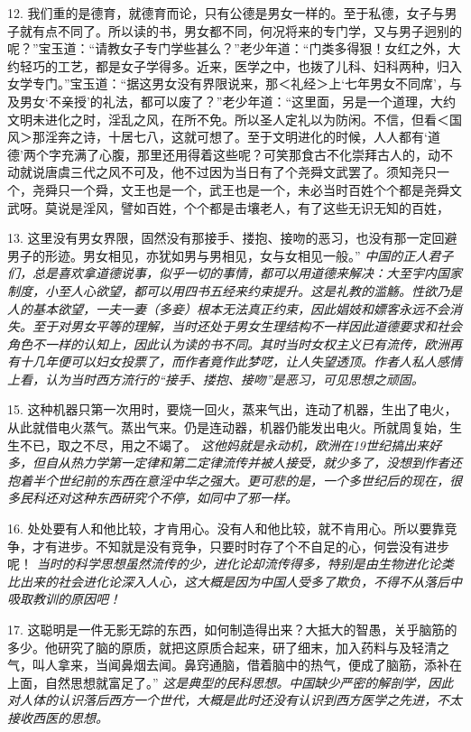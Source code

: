 12. 我们重的是德育，就德育而论，只有公德是男女一样的。至于私德，女子与男子就有点不同了。所以读的书，男女都不同，何况将来的专门学，又与男子迥别的呢？”宝玉道：“请教女子专门学些甚么？”老少年道：“门类多得狠！女红之外，大约轻巧的工艺，都是女子学得多。近来，医学之中，也拨了儿科、妇科两种，归入女学专门。”宝玉道：“据这男女没有界限说来，那＜礼经＞上‘七年男女不同席’，与及男女‘不亲授’的礼法，都可以废了？”老少年道：“这里面，另是一个道理，大约文明未进化之时，淫乱之风，在所不免。所以圣人定礼以为防闲。不信，但看＜国风＞那淫奔之诗，十居七八，这就可想了。至于文明进化的时候，人人都有‘道德’两个字充满了心腹，那里还用得着这些呢？可笑那食古不化崇拜古人的，动不动就说唐虞三代之风不可及，他不过因为当日有了个尧舜文武罢了。须知尧只一个，尧舜只一个舜，文王也是一个，武王也是一个，未必当时百姓个个都是尧舜文武呀。莫说是淫风，譬如百姓，个个都是击壤老人，有了这些无识无知的百姓，

13. 这里没有男女界限，固然没有那接手、搂抱、接吻的恶习，也没有那一定回避男子的形迹。男女相见，亦犹如男与男相见，女与女相见一般。”
\emph{中国的正人君子们，总是喜欢拿道德说事，似乎一切的事情，都可以用道德来解决：大至宇内国家制度，小至人心欲望，都可以用四书五经来约束提升。这是礼教的滥觞。性欲乃是人的基本欲望，一夫一妻（多妾）根本无法真正约束，因此娼妓和嫖客永远不会消失。至于对男女平等的理解，当时还处于男女生理结构不一样因此道德要求和社会角色不一样的认知上，因此认为读的书不同。其时当时女权主义已有流传，欧洲再有十几年便可以妇女投票了，而作者竟作此梦呓，让人失望透顶。作者人私人感情上看，认为当时西方流行的“接手、搂抱、接吻”是恶习，可见思想之顽固。}

15. 这种机器只第一次用时，要烧一回火，蒸来气出，连动了机器，生出了电火，从此就借电火蒸气。蒸出气来。仍是连动器，机器仍能发出电火。所就周复始，生生不已，取之不尽，用之不竭了。
\emph{这他妈就是永动机，欧洲在19世纪搞出来好多，但自从热力学第一定律和第二定律流传并被人接受，就少多了，没想到作者还抱着半个世纪前的东西在意淫中华之强大。更可悲的是，一个多世纪后的现在，很多民科还对这种东西研究个不停，如同中了邪一样。}

16. 处处要有人和他比较，才肯用心。没有人和他比较，就不肯用心。所以要靠竞争，才有进步。不知就是没有竞争，只要时时存了个不自足的心，何尝没有进步呢！
\emph{当时的科学思想虽然流传的少，进化论却流传得多，特别是由生物进化论类比出来的社会进化论深入人心，这大概是因为中国人受多了欺负，不得不从落后中吸取教训的原因吧！}

17. 这聪明是一件无影无踪的东西，如何制造得出来？大抵大的智愚，关乎脑筋的多少。他研究了脑的原质，就把这原质合起来，研了细末，加入药料与及轻清之气，叫人拿来，当闻鼻烟去闻。鼻窍通脑，借着脑中的热气，便成了脑筋，添补在上面，自然思想就富足了。”
\emph{这是典型的民科思想。中国缺少严密的解剖学，因此对人体的认识落后西方一个世代，大概是此时还没有认识到西方医学之先进，不太接收西医的思想。}

